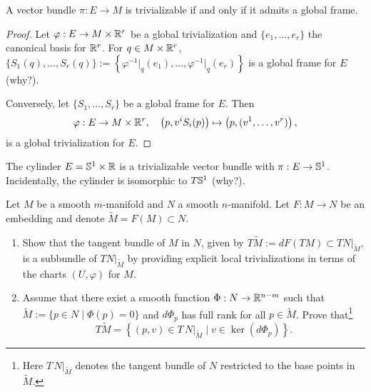 \begin{proposition}\label{prop:trivializable}
  A vector bundle $\pi: E\to M$ is trivializable if and only if it admits a global frame.
\end{proposition}
\begin{proof}
  Let $\varphi: E \to M\times\mathbb{R}^r$ be a global trivialization and $\{e_1, \ldots, e_r\}$ the canonical basis for $\mathbb{R}^r$.
  For $q\in M\times\mathbb{R}^r$, $\{S_1(q), \ldots, S_r(q)\} := \left\{\varphi^{-1}\big|_q(e_1), \ldots, \varphi^{-1}\big|_q(e_r) \right\}$ is a global frame for $E$ (why?).

  Conversely, let $\{S_1, \ldots, S_r\}$ be a global frame for $E$. Then
  \begin{equation}
    \varphi: E \to M\times\mathbb{R}^r, \quad
    \left(p, v^i S_i(p)\right) \mapsto \left(p, (v^1, \ldots, v^r)\right),
  \end{equation}
  is a global trivialization for $E$.
\end{proof}

\begin{example}
  The cylinder $E = \mathbb{S}^1\times\mathbb{R}$ is a trivializable vector bundle with $\pi:E\to \mathbb{S}^1$.
  Incidentally, the cylinder is isomorphic to $T\mathbb{S}^1$ (why?).
\end{example}

\begin{exercise}
  Let $M$ be a smooth $m$-manifold and $N$ a smooth $n$-manifold.
  Let $F:M\to N$ be an embedding and denote $\widetilde M = F(M)\subset N$.
  \begin{enumerate}
    \item Show that the tangent bundle of $M$ in $N$, given by $T\widetilde M := dF(TM) \subset TN\big|_{\widetilde M}$, is a subbundle of $TN\big|_{\widetilde M}$ by providing explicit local trivializations in terms of the charts $(U, \varphi)$ for $M$.
    \item Assume that there exist a smooth function $\Phi:N\to\mathbb{R}^{n-m}$ such that $\widetilde M := \{p\in N \mid \Phi(p) = 0\}$ and $d\Phi_p$ has full rank for all $p\in\widetilde M$. Prove that\footnote{Here $T\,N|_{\widetilde{M}}$ denotes the tangent bundle of $N$ restricted to the base points in $\widetilde{M}$.}
          \begin{equation}
            T\widetilde{M} = \left\{(p,v)\in T\,N|_{\widetilde{M}} \mid v\in\ker(d\Phi_p)\right\}.
          \end{equation}
  \end{enumerate}
\end{exercise}
